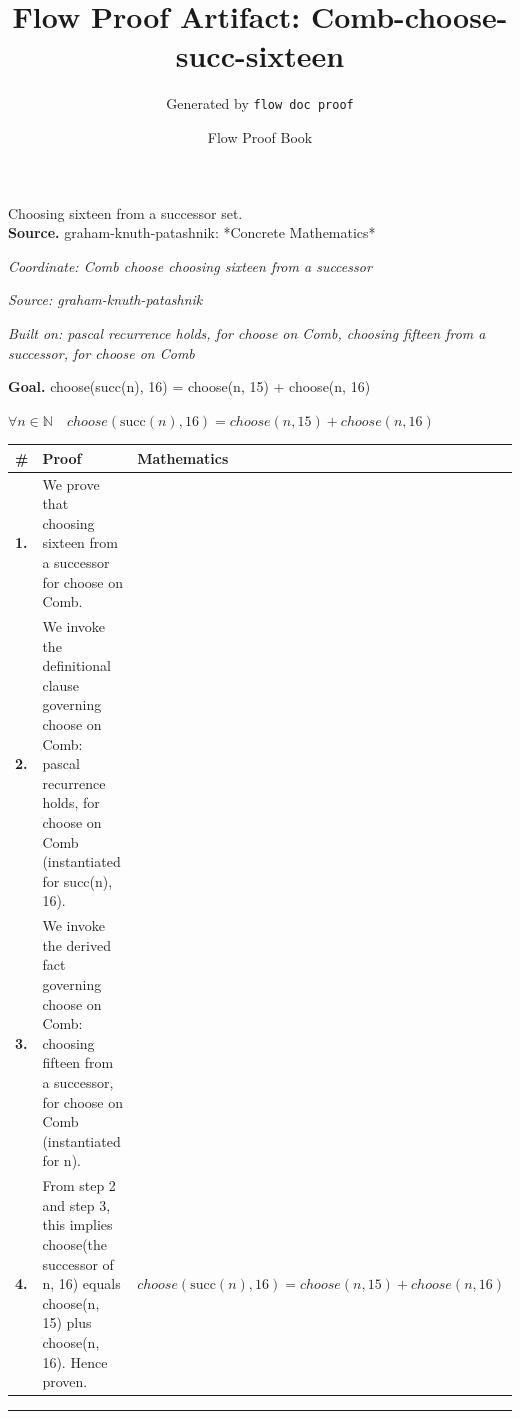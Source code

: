 \documentclass[11pt]{article}
\title{Flow Proof Artifact: Comb-choose-succ-sixteen}
\author{Generated by \texttt{flow doc proof}}
\date{Flow Proof Book}
\theoremstyle{definition}
\begin{document}
\maketitle
Choosing sixteen from a successor set.\\[0.5em]
\textbf{Source.} graham-knuth-patashnik: *Concrete Mathematics*\\[0.5em]
\bigskip
{}\par
\smallskip\noindent\textit{Coordinate: Comb \cdot choose \cdot choosing sixteen from a successor}\par
\smallskip\noindent\textit{Source: graham-knuth-patashnik}\par
\smallskip\noindent\textit{Built on: pascal recurrence holds, for choose on Comb, choosing fifteen from a successor, for choose on Comb}\par
\medskip
\noindent\textbf{Goal.} choose(succ(n), 16) = choose(n, 15) + choose(n, 16)\par
\noindent$\displaystyle \forall n \in \mathbb{N}\quad choose(\mathrm{succ}(n), 16) = choose(n, 15) + choose(n, 16)$\par
\medskip
\noindent
\begin{tabular}{@{} >{\raggedright\arraybackslash}p{} >{\raggedright\arraybackslash}p{} >{\raggedleft\arraybackslash}p{} @{}}
\textbf{\#} & \textbf{Proof} & \textbf{Mathematics} \\
\midrule
\textbf{1.} & We prove that choosing sixteen from a successor for choose on Comb. & \\[0.45em]
\textbf{2.} & We invoke the definitional clause governing choose on Comb: pascal recurrence holds, for choose on Comb (instantiated for succ(n), 16). & \\[0.45em]
\textbf{3.} & We invoke the derived fact governing choose on Comb: choosing fifteen from a successor, for choose on Comb (instantiated for n). & \\[0.45em]
\textbf{4.} & From step 2 and step 3, this implies choose(the successor of n, 16) equals choose(n, 15) plus choose(n, 16). Hence proven. & $\displaystyle choose(\mathrm{succ}(n), 16) = choose(n, 15) + choose(n, 16)$ \\[0.45em]
\bottomrule
\end{tabular}
\label{thm:Comb-choose-choosing_sixteen_from_a_successor}
\par\medskip\hrule
\end{document}
